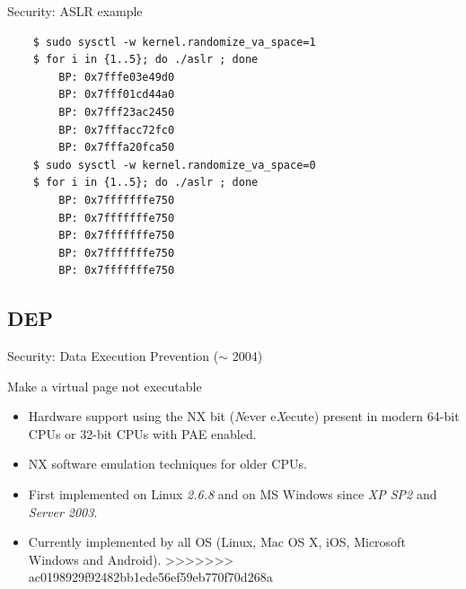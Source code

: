 \begin{frame}[fragile]{Security: ASLR example}
	\begin{lstlisting}
	$ sudo sysctl -w kernel.randomize_va_space=1
	$ for i in {1..5}; do ./aslr ; done
		BP: 0x7fffe03e49d0
		BP: 0x7fff01cd44a0
		BP: 0x7fff23ac2450
		BP: 0x7fffacc72fc0
		BP: 0x7fffa20fca50
	$ sudo sysctl -w kernel.randomize_va_space=0
	$ for i in {1..5}; do ./aslr ; done
		BP: 0x7fffffffe750
		BP: 0x7fffffffe750
		BP: 0x7fffffffe750
		BP: 0x7fffffffe750
		BP: 0x7fffffffe750
	\end{lstlisting}
\end{frame}

\subsection{DEP}
\begin{frame}{Security: Data Execution Prevention ($\sim$ 2004)}
	\begin{block}{Make a virtual page not executable}
		\begin{itemize}
			\item Hardware support using the NX bit (\emph{N}ever e\emph{X}ecute)
				present in modern 64-bit CPUs or 32-bit CPUs with PAE enabled.
			\item NX software emulation techniques for older CPUs.
			\item First implemented on Linux \emph{2.6.8} and on MS Windows since
				\emph{XP SP2} and \emph{Server 2003}.
			\item Currently implemented by all OS (Linux, Mac OS X, iOS, Microsoft Windows and Android).
>>>>>>> ac0198929f92482bb1ede56ef59eb770f70d268a
		\end{itemize}
	\end{block}
\end{frame}

